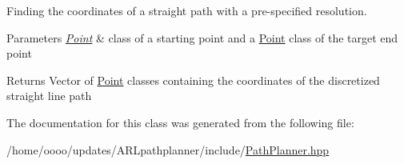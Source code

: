 Finding the coordinates of a straight path with a pre-\/specified resolution. 


\begin{DoxyParams}{Parameters}
{\em \hyperlink{classPoint}{Point}} & class of a starting point and a \hyperlink{classPoint}{Point} class of the target end point \\
\hline
\end{DoxyParams}
\begin{DoxyReturn}{Returns}
Vector of \hyperlink{classPoint}{Point} classes containing the coordinates of the discretized straight line path 
\end{DoxyReturn}


The documentation for this class was generated from the following file\+:\begin{DoxyCompactItemize}
\item 
/home/oooo/updates/\+A\+R\+Lpathplanner/include/\hyperlink{PathPlanner_8hpp}{Path\+Planner.\+hpp}\end{DoxyCompactItemize}
